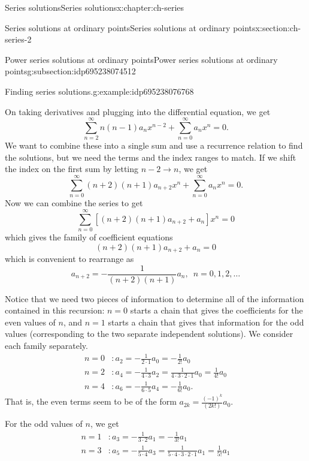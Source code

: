 \documentclass[oneside,10pt,]{book}
\numberwithin{equation}{section}
\numberwithin{equation}{section}
\newcommand{\ps}{\displaystyle \sum_{n=0}^\infty a_n x^n}
\newcommand{\amp}{&}
\begin{document}
\begin{chapterptx}{Series solutions}{}{Series solutions}{}{}{x:chapter:ch-series}
\begin{sectionptx}{Series solutions at ordinary points}{}{Series solutions at ordinary points}{}{}{x:section:ch-series-2}
\begin{subsectionptx}{Power series solutions at ordinary points}{}{Power series solutions at ordinary points}{}{}{g:subsection:idp695238074512}
\begin{example}{Finding series solutions.}{g:example:idp695238076768}
\par
On taking derivatives and plugging into the differential equation, we get%
\begin{equation*}
\sum_{n=2}^\infty n(n-1) a_n x^{n-2} + \ps = 0.
\end{equation*}
We want to combine these into a single sum and use a recurrence relation to find the solutions, but we need the terms and the index ranges to match. If we shift the index on the first sum by letting \(n - 2 \to n \), we get%
\begin{equation*}
\sum_{n=0}^\infty (n+2)(n+1) a_{n+2} x^{n} + \ps = 0.
\end{equation*}
Now we can combine the series to get%
\begin{equation*}
\sum_{n=0}^\infty \left[(n+2)(n+1) a_{n+2} + a_n\right]x^n = 0
\end{equation*}
which gives the family of coefficient equations%
\begin{equation*}
(n+2)(n+1)a_{n+2} + a_n = 0
\end{equation*}
which is convenient to rearrange as%
\begin{equation*}
a_{n+2} = -\frac{1}{(n+2)(n+1)} a_n, \,\,\, n = 0, 1, 2, \ldots
\end{equation*}
%
\par
Notice that we need two pieces of information to determine all of the information contained in this recursion: \(n = 0\) starts a chain that gives the coefficients for the even values of \(n\), and \(n = 1\) starts a chain that gives that information for the odd values (corresponding to the two separate independent solutions). We consider each family separately.%
\begin{align*}
n = 0\amp: a_2 = -\frac{1}{2 \cdot 1} a_0 = -\frac{1}{2!}a_0\\
n = 2\amp: a_4 = -\frac{1}{4 \cdot 3} a_2 = \frac{1}{4 \cdot 3 \cdot 2 \cdot 1} a_0 = \frac{1}{4!} a_0\\
n=4\amp: a_6 = -\frac{1}{6 \cdot 5} a_4 = -\frac{1}{6!} a_0.
\end{align*}
That is, the even terms seem to be of the form \(a_{2k} = \frac{(-1)^k}{(2k!)} a_0\).%
\par
For the odd values of \(n\), we get%
\begin{align*}
n = 1\amp: a_3 = -\frac{1}{3 \cdot 2} a_1 = -\frac{1}{3!}a_1\\
n = 3\amp: a_5 = -\frac{1}{5 \cdot 4} a_3 = \frac{1}{5 \cdot 4 \cdot 3 \cdot2 \cdot 1} a_1 = \frac{1}{5!} a_1\\

\end{align*}
\end{example}
\end{subsectionptx}
\end{sectionptx}
\end{chapterptx}
\end{document}
